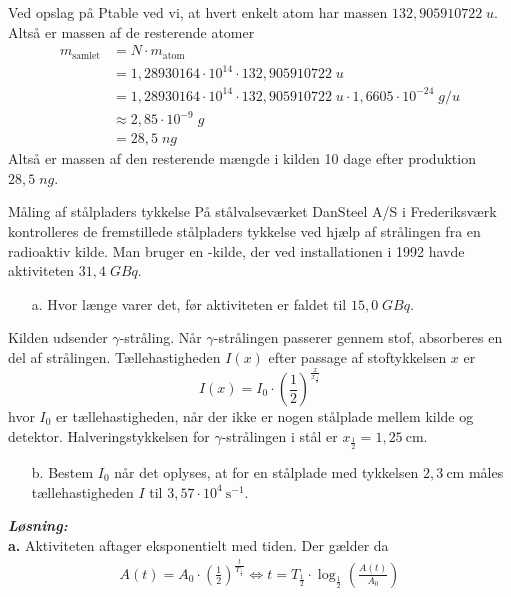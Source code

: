\documentclass{report}
\newcommand{\sol}{\setlength{\parindent}{0cm}\textbf{\textit{Løsning:}}\setlength{\parindent}{1cm}}
\begin{document}
Ved opslag på Ptable ved vi, at hvert enkelt atom har massen $132,905910722 \;\unit{u} $.
Altså er massen af de resterende atomer 
\begin{equation*}
\begin{split}
  m_{\text{samlet} }&= N \cdot m_{\text{atom} }\\ 
  &=1,28930164 \cdot 10^{14} \cdot 132,905910722 \;\unit{u}\\ 
  &= 1,28930164 \cdot 10^{14}\cdot 132,905910722 \;\unit{u} \cdot 1,6605 \cdot 10^{-24} \;\unit{g/u} \\ 
  &\approx 2,85 \cdot 10^{-9} \;\unit{g} \\ 
  &= 28,5 \;\unit{ng} 
\end{split}
\end{equation*}
Altså er massen af den resterende mængde  i kilden 10 dage efter produktion $28,5 \;\unit{ng} $.
\begin{question}{Måling af stålpladers tykkelse}{}
  På stålvalseværket DanSteel A/S i Frederiksværk kontrolleres de fremstillede stålpladers tykkelse ved hjælp af strålingen fra en radioaktiv kilde.
  Man bruger en -kilde, der ved installationen i 1992 havde aktiviteten $31,4 \;\unit{GBq} $.
  \begin{itemize}
    \item[a.] Hvor længe varer det, før aktiviteten er faldet til $15,0 \;\unit{GBq} $.
  \end{itemize}
  Kilden udsender $\gamma$-stråling.
Når $\gamma$-strålingen passerer gennem stof, absorberes en del af strålingen.
Tællehastigheden $I(x)$ efter passage af stoftykkelsen $x$ er
$$
I(x)=I_0 \cdot\left(\frac{1}{2}\right)^{\frac{x}{x_{\frac{1}{2}}}}
$$
hvor $I_0$ er tællehastigheden, når der ikke er nogen stålplade mellem kilde og detektor. Halveringstykkelsen for $\gamma$-strålingen i stål er $x_{\frac{1}{2}}=1,25 \mathrm{~cm}$.
\begin{itemize}
  \item[b.]  Bestem $I_0$ når det oplyses, at for en stålplade med tykkelsen $2,3 \mathrm{~cm}$ måles tællehastigheden $I$ til $3,57 \cdot 10^4 \mathrm{~s}^{-1}$.
\end{itemize}
\end{question}
\sol \\
\textbf{a.}
Aktiviteten aftager eksponentielt med tiden. Der gælder da
\begin{equation*}
\begin{split}
  A(t)=A_0 \cdot \left(\frac{1}{2}\right)^{\frac{t}{T_{\frac{1}{2}}}} \iff t= T_{\frac{1}{2}} \cdot \log_{\frac{1}{2}} \left(\frac{A(t)}{A_0}\right) 
\end{split}
\end{equation*}
\end{document}
